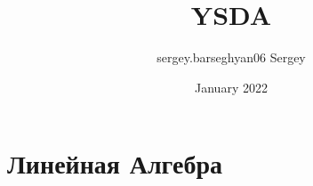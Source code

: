 \documentclass[16pt]{article}
\title{YSDA}
\author{sergey.barseghyan06 Sergey}
\date{January 2022}
\begin{document}
\maketitle

\section{Линейная Алгебра}

\begin{thm}

\end{thm}


\end{document}
